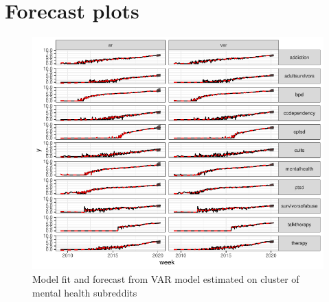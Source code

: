 \documentclass[manuscript]{acmart}\usepackage[]{graphicx}\usepackage[]{color}
\makeatletter
\def\maxwidth{ %
  \ifdim\Gin@nat@width>\linewidth
    \linewidth
  \else
    \Gin@nat@width
  \fi
}
\makeatother
\begin{document}

\clearpage
\section{Forecast plots}

\begin{figure}[h]
\centering

\includegraphics[width=\maxwidth]{figures/knitr-mut_fcast-1} 

\caption{Model fit and forecast from VAR model estimated on cluster of mental health subreddits} 
\end{figure}
\end{document}
